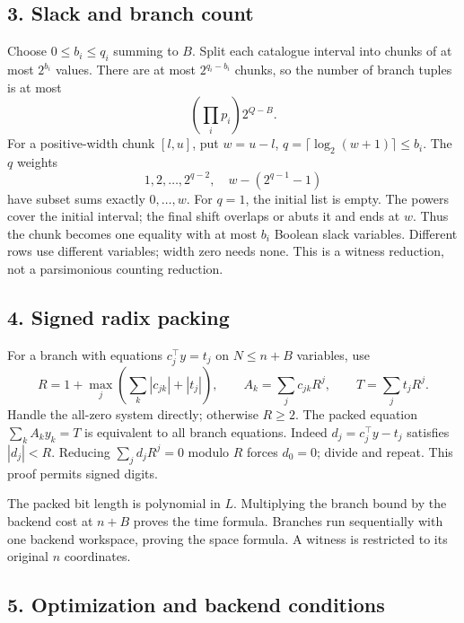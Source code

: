 \hypertarget{af-c97649ed9d-slack-and-branch-count}{%
\subsection{3. Slack and branch count}\label{af-c97649ed9d-slack-and-branch-count}}

Choose \(0\le b_i\le q_i\) summing to \(B\). Split each catalogue interval into chunks of at most \(2^{b_i}\) values. There are at most \(2^{q_i-b_i}\) chunks, so the number of branch tuples is at most \[
\left(\prod_i p_i\right)2^{Q-B}.
\] For a positive-width chunk \([l,u]\), put \(w=u-l\), \(q=\lceil\log_2(w+1)\rceil\le b_i\). The \(q\) weights \[
1,2,\ldots,2^{q-2},\quad w-(2^{q-1}-1)
\] have subset sums exactly \(0,\ldots,w\). For \(q=1\), the initial list is empty. The powers cover the initial interval; the final shift overlaps or abuts it and ends at \(w\). Thus the chunk becomes one equality with at most \(b_i\) Boolean slack variables. Different rows use different variables; width zero needs none. This is a witness reduction, not a parsimonious counting reduction.

\hypertarget{af-c97649ed9d-signed-radix-packing}{%
\subsection{4. Signed radix packing}\label{af-c97649ed9d-signed-radix-packing}}

For a branch with equations \(c_j^\top y=t_j\) on \(N\le n+B\) variables, use \[
R=1+\max_j\left(\sum_k|c_{jk}|+|t_j|\right),\qquad
A_k=\sum_jc_{jk}R^j,\qquad T=\sum_jt_jR^j.
\] Handle the all-zero system directly; otherwise \(R\ge2\). The packed equation \(\sum_kA_ky_k=T\) is equivalent to all branch equations. Indeed \(d_j=c_j^\top y-t_j\) satisfies \(|d_j|<R\). Reducing \(\sum_jd_jR^j=0\) modulo \(R\) forces \(d_0=0\); divide and repeat. This proof permits signed digits.

The packed bit length is polynomial in \(L\). Multiplying the branch bound by the backend cost at \(n+B\) proves the time formula. Branches run sequentially with one backend workspace, proving the space formula. A witness is restricted to its original \(n\) coordinates.

\hypertarget{af-c97649ed9d-optimization-and-backend-conditions}{%
\subsection{5. Optimization and backend conditions}\label{af-c97649ed9d-optimization-and-backend-conditions}}

